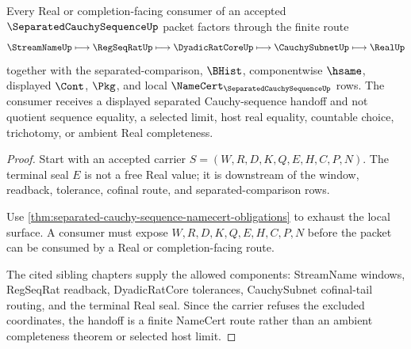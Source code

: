\begin{theorem}
\label{thm:separated-cauchy-sequence-real-completion-handoff}
Every Real or completion-facing consumer of an accepted $\SeparatedCauchySequenceUp$ packet factors through the finite route
$$
\StreamNameUp \longmapsto \RegSeqRatUp \longmapsto \DyadicRatCoreUp \longmapsto \CauchySubnetUp \longmapsto \RealUp
$$
together with the separated-comparison, $\BHist$, componentwise $\hsame$, displayed $\Cont$, $\Pkg$, and local $\NameCert_{\SeparatedCauchySequenceUp}$ rows. The consumer receives a displayed separated Cauchy-sequence handoff and not quotient sequence equality, a selected limit, host real equality, countable choice, trichotomy, or ambient Real completeness.
\end{theorem}
\begin{proof}
Start with an accepted carrier $S=(W,R,D,K,Q,E,H,C,P,N)$. The terminal seal $E$ is not a free Real value; it is downstream of the window, readback, tolerance, cofinal route, and separated-comparison rows.

Use \autoref{thm:separated-cauchy-sequence-namecert-obligations} to exhaust the local surface. A consumer must expose $W,R,D,K,Q,E,H,C,P,N$ before the packet can be consumed by a Real or completion-facing route.

The cited sibling chapters supply the allowed components: StreamName windows, RegSeqRat readback, DyadicRatCore tolerances, CauchySubnet cofinal-tail routing, and the terminal Real seal. Since the carrier refuses the excluded coordinates, the handoff is a finite NameCert route rather than an ambient completeness theorem or selected host limit.
\end{proof}




